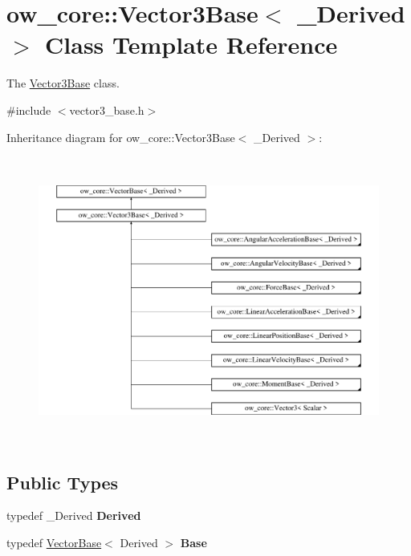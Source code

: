 \hypertarget{classow__core_1_1Vector3Base}{}\section{ow\+\_\+core\+:\+:Vector3\+Base$<$ \+\_\+\+Derived $>$ Class Template Reference}
\label{classow__core_1_1Vector3Base}


The \hyperlink{classow__core_1_1Vector3Base}{Vector3\+Base} class.  




{\ttfamily \#include $<$vector3\+\_\+base.\+h$>$}

Inheritance diagram for ow\+\_\+core\+:\+:Vector3\+Base$<$ \+\_\+\+Derived $>$\+:\begin{figure}[H]
\begin{center}
\leavevmode
\includegraphics[height=9.459459cm]{df/dda/classow__core_1_1Vector3Base}
\end{center}
\end{figure}
\subsection*{Public Types}
\begin{DoxyCompactItemize}
\item 
typedef \+\_\+\+Derived {\bfseries Derived}\hypertarget{classow__core_1_1Vector3Base_a6b06a8274f8d02af664289b019278d99}{}\label{classow__core_1_1Vector3Base_a6b06a8274f8d02af664289b019278d99}

\item 
typedef \hyperlink{classow__core_1_1VectorBase}{Vector\+Base}$<$ Derived $>$ {\bfseries Base}\hypertarget{classow__core_1_1Vector3Base_ac6abab4e12e0c2f895cd5e7754ea676f}{}\label{classow__core_1_1Vector3Base_ac6abab4e12e0c2f895cd5e7754ea676f}

\end{DoxyCompactItemize}
